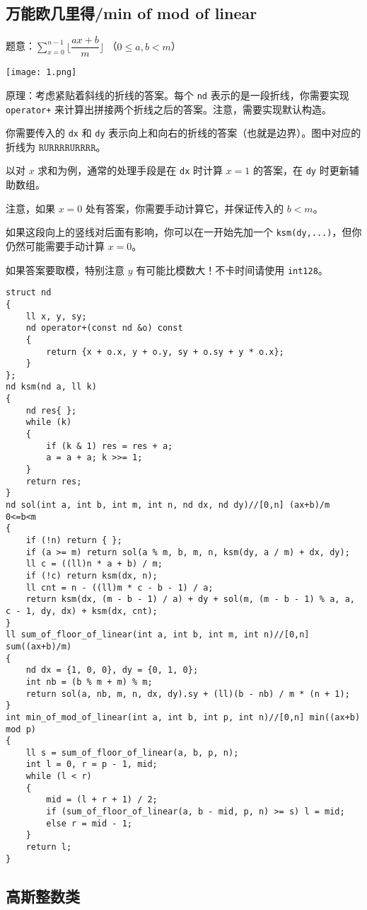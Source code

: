 \documentclass[12pt]{ctexart}
\begin{document}
\subsection{万能欧几里得/min of mod of linear}

题意：$\sum\limits_{x=0}^{n-1}\lfloor \dfrac {ax+b}m\rfloor$ （$0\le a,b<m$）

\texttt{[image: 1.png]}

原理：考虑紧贴着斜线的折线的答案。每个 \verb|nd| 表示的是一段折线，你需要实现 \verb|operator+| 来计算出拼接两个折线之后的答案。注意，需要实现默认构造。

你需要传入的 \verb|dx| 和 \verb|dy| 表示向上和向右的折线的答案（也就是边界）。图中对应的折线为 $\texttt{RURRRRURRRR}$。

以对 $x$ 求和为例，通常的处理手段是在 \verb|dx| 时计算 $x=1$ 的答案，在 \verb|dy| 时更新辅助数组。

注意，如果 $x=0$ 处有答案，你需要手动计算它，并保证传入的 $b<m$。

如果这段向上的竖线对后面有影响，你可以在一开始先加一个 \verb|ksm(dy,...)|，但你仍然可能需要手动计算 $x=0$。

如果答案要取模，特别注意 $y$ 有可能比模数大！不卡时间请使用 \verb|int128|。

\begin{lstlisting}
struct nd
{
	ll x, y, sy;
	nd operator+(const nd &o) const
	{
		return {x + o.x, y + o.y, sy + o.sy + y * o.x};
	}
};
nd ksm(nd a, ll k)
{
	nd res{ };
	while (k)
	{
		if (k & 1) res = res + a;
		a = a + a; k >>= 1;
	}
	return res;
}
nd sol(int a, int b, int m, int n, nd dx, nd dy)//[0,n] (ax+b)/m 0<=b<m
{
	if (!n) return { };
	if (a >= m) return sol(a % m, b, m, n, ksm(dy, a / m) + dx, dy);
	ll c = ((ll)n * a + b) / m;
	if (!c) return ksm(dx, n);
	ll cnt = n - ((ll)m * c - b - 1) / a;
	return ksm(dx, (m - b - 1) / a) + dy + sol(m, (m - b - 1) % a, a, c - 1, dy, dx) + ksm(dx, cnt);
}
ll sum_of_floor_of_linear(int a, int b, int m, int n)//[0,n] sum((ax+b)/m)
{
	nd dx = {1, 0, 0}, dy = {0, 1, 0};
	int nb = (b % m + m) % m;
	return sol(a, nb, m, n, dx, dy).sy + (ll)(b - nb) / m * (n + 1);
}
int min_of_mod_of_linear(int a, int b, int p, int n)//[0,n] min((ax+b) mod p)
{
	ll s = sum_of_floor_of_linear(a, b, p, n);
	int l = 0, r = p - 1, mid;
	while (l < r)
	{
		mid = (l + r + 1) / 2;
		if (sum_of_floor_of_linear(a, b - mid, p, n) >= s) l = mid;
		else r = mid - 1;
	}
	return l;
}
\end{lstlisting}


\subsection{高斯整数类}
\end{document}
